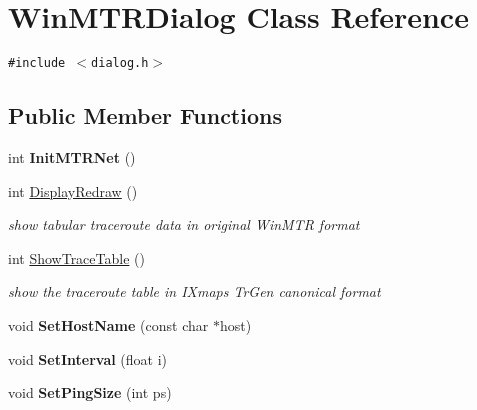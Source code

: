 \hypertarget{classWinMTRDialog}{
\section{WinMTRDialog Class Reference}
\label{classWinMTRDialog}
}
{\tt \#include $<$dialog.h$>$}

\subsection*{Public Member Functions}
\begin{CompactItemize}
\item 
\hypertarget{classWinMTRDialog_fc72d03cb4470336153dabf4cd46443a}{
int \textbf{InitMTRNet} ()}
\label{classWinMTRDialog_fc72d03cb4470336153dabf4cd46443a}

\item 
\hypertarget{classWinMTRDialog_995cf3af267a41b107f0a96bdd2993b7}{
int \hyperlink{classWinMTRDialog_995cf3af267a41b107f0a96bdd2993b7}{DisplayRedraw} ()}
\label{classWinMTRDialog_995cf3af267a41b107f0a96bdd2993b7}

\begin{CompactList}\small\item\em show tabular traceroute data in original WinMTR format \item\end{CompactList}\item 
\hypertarget{classWinMTRDialog_b2a96ff96df945607d22d696b0018f93}{
int \hyperlink{classWinMTRDialog_b2a96ff96df945607d22d696b0018f93}{ShowTraceTable} ()}
\label{classWinMTRDialog_b2a96ff96df945607d22d696b0018f93}

\begin{CompactList}\small\item\em show the traceroute table in IXmaps TrGen canonical format \item\end{CompactList}\item 
\hypertarget{classWinMTRDialog_8087c87ed54fc6382edf2a7a769ec3ef}{
void \textbf{SetHostName} (const char $\ast$host)}
\label{classWinMTRDialog_8087c87ed54fc6382edf2a7a769ec3ef}

\item 
\hypertarget{classWinMTRDialog_956a3392d868358b474949bb92e762c3}{
void \textbf{SetInterval} (float i)}
\label{classWinMTRDialog_956a3392d868358b474949bb92e762c3}

\item 
\hypertarget{classWinMTRDialog_de87db1396663df35286539376808445}{
void \textbf{SetPingSize} (int ps)}
\label{classWinMTRDialog_de87db1396663df35286539376808445}


\end{CompactItemize}
